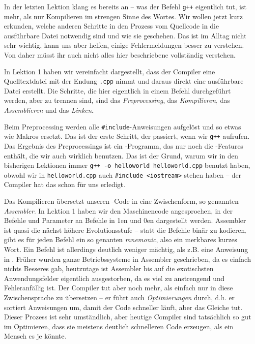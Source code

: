
In der letzten Lektion klang es bereits an -- was der Befehl \texttt{g++}
eigentlich tut, ist mehr, als nur Kompilieren im strengen Sinne des Wortes. Wir
wollen jetzt kurz erkunden, welche anderen Schritte in den Prozess vom
Quellcode in die ausführbare Datei notwendig sind und wie sie geschehen. Das
ist im Alltag nicht sehr wichtig, kann uns aber helfen, einige Fehlermeldungen
besser zu verstehen. Von daher müsst ihr auch nicht alles hier beschriebene
vollständig verstehen.

In Lektion 1 haben wir vereinfacht dargestellt, dass der Compiler eine
Quelltextdatei mit der Endung \texttt{.cpp} nimmt und daraus direkt eine
ausführbare Datei erstellt. Die Schritte, die hier eigentlich in einem Befehl
durchgeführt werden, aber zu trennen sind, sind das \emph{Preprocessing}, das \emph{Kompilieren}, das
\emph{Assemblieren} und das \emph{Linken}.

Beim Preprocessing werden alle \texttt{\#include}-Anweisungen aufgelöst und so etwas wie Makros ersetzt. Das ist der erste Schritt, der passiert, wenn wir \texttt{g++} aufrufen. Das Ergebnis des Preprocessings ist ein \Cpp-Programm, das nur noch die \Cpp-Features enthält, die wir auch wirklich benutzen. Das ist der Grund, warum wir in den bisherigen Lektionen immer \texttt{g++ -o helloworld helloworld.cpp} benutzt haben, obwohl wir in \texttt{helloworld.cpp} auch \texttt{#include <iostream>} stehen haben -- der Compiler hat das schon für uns erledigt.

Das Kompilieren übersetzt unseren \Cpp-Code in eine Zwischenform, so genannten
\emph{Assembler}. In Lektion 1 haben wir den Maschinencode angesprochen, in der
Befehle und Parameter an Befehle in 1en und 0en dargestellt werden. Assembler
ist quasi die nächst höhere Evolutionsstufe -- statt die Befehle binär zu
kodieren, gibt es für jeden Befehl ein so genanten \emph{mnemonic}, also ein
merkbares kurzes Wort. Ein Befehl ist allerdings deutlich weniger mächtig, als
z.B. eine Anweisung in \Cpp. Früher wurden ganze Betriebssysteme in Assembler
geschrieben, da es einfach nichts Besseres gab, heutzutage ist Assembler bis
auf die exotischsten Anwendungsfelder eigentlich ausgestorben, da es viel zu
anstrengend und Fehleranfällig ist. Der Compiler tut aber noch mehr, als
einfach nur in diese Zwischensprache zu übersetzen -- er führt auch
\emph{Optimierungen} durch, d.h. er sortiert Anweisungen um, damit der Code
schneller läuft, aber das Gleiche tut. Dieser Prozess ist sehr umständlich,
aber heutige Compiler sind tatsächlich so gut im Optimieren, dass sie meistens
deutlich schnelleren Code erzeugen, als ein Mensch es je könnte.

